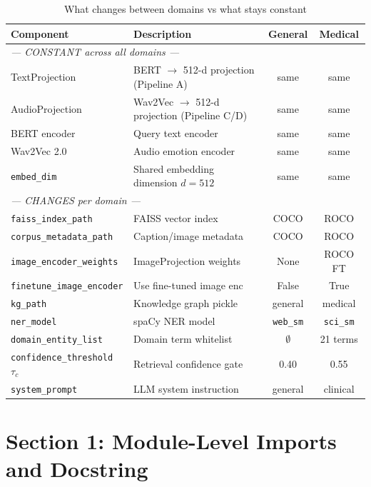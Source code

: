 \documentclass[12pt,a4paper]{article}
\theoremstyle{definition}
\theoremstyle{remark}
\begin{document}
\begin{table}[H]
\centering
\caption{What changes between domains vs what stays constant}
\begin{tabularx}{\textwidth}{lXcc}
\toprule
Component & Description & General & Medical \\
\midrule
\multicolumn{4}{l}{\textit{--- CONSTANT across all domains ---}} \\
TextProjection & BERT $\to$ 512-d projection (Pipeline A) & same & same \\
AudioProjection & Wav2Vec $\to$ 512-d projection (Pipeline C/D) & same & same \\
BERT encoder & Query text encoder & same & same \\
Wav2Vec 2.0 & Audio emotion encoder & same & same \\
\texttt{embed\_dim} & Shared embedding dimension $d=512$ & same & same \\
\midrule
\multicolumn{4}{l}{\textit{--- CHANGES per domain ---}} \\
\texttt{faiss\_index\_path} & FAISS vector index & COCO & ROCO \\
\texttt{corpus\_metadata\_path} & Caption/image metadata & COCO & ROCO \\
\texttt{image\_encoder\_weights} & ImageProjection weights & None & ROCO FT \\
\texttt{finetune\_image\_encoder} & Use fine-tuned image enc & False & True \\
\texttt{kg\_path} & Knowledge graph pickle & general & medical \\
\texttt{ner\_model} & spaCy NER model & \texttt{web\_sm} & \texttt{sci\_sm} \\
\texttt{domain\_entity\_list} & Domain term whitelist & $\emptyset$ & 21 terms \\
\texttt{confidence\_threshold} $\tau_c$ & Retrieval confidence gate & 0.40 & 0.55 \\
\texttt{system\_prompt} & LLM system instruction & general & clinical \\
\bottomrule
\end{tabularx}
\end{table}

\section{Section 1: Module-Level Imports and Docstring}
\end{document}
